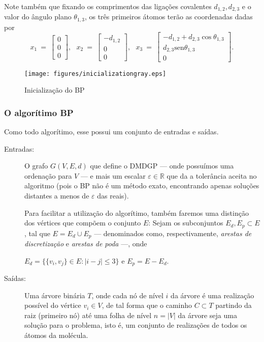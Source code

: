 Note também que fixando os comprimentos das ligações covalentes $d_{1,2},d_{2,3}$ e o valor do ângulo plano $\theta_{1,3}$, os três primeiros átomos terão as coordenadas dadas por
$$
x_1\:=\:
\begin{bmatrix}
	0\\ 
	0\\  
	0
\end{bmatrix},\:\:\:
x_2\:=\:
\begin{bmatrix}
	-d_{1,2}\\ 
	0\\  
	0
\end{bmatrix},\:\:\:
x_3\:=\:
\begin{bmatrix}
	-d_{1,2}+d_{2,3}\cos\theta_{1,3}\\ 
	d_{2,3}\mbox{sen}\theta_{1,3}\\  
	0
\end{bmatrix}.
$$

\begin{figure}[H]
	\begin{center}
		\texttt{[image: figures/inicializationgray.eps]}
	\end{center}
	\caption{Inicialização do BP}
	\label{fig:inicializacao}
\end{figure}	

\subsubsection*{O algorítimo BP}

Como todo algorítimo, esse possui um conjunto de entradas e saídas.
\begin{description}
	\item[Entradas:] O grafo $G(V, E, d)$ que define o DMDGP --- onde possuímos uma ordenação para $V$ --- e mais um escalar $\varepsilon \in \mathbb{R}$ que da a tolerância aceita no algoritmo (pois o BP não é um método exato, encontrando apenas soluções distantes a menos de $\varepsilon$ das reais).
	
	Para facilitar a utilização do algorítimo, também faremos uma distinção dos vértices que compõem o conjunto $E$: Sejam os subconjuntos $E_{d}, E_p \subset E$, tal que $E = E_{d} \cup E_{p}$ --- denominados como, respectivamente, \textit{arestas de discretização} e \textit{arestas de poda} ---, onde
	
	\begin{center}
		$E_{d} = \{\{v_i,v_j\} \in E : |i-j|\leq 3\}$ e $E_{p} = E - E_d$.
	\end{center}
	
	\item[Saídas:] Uma árvore binária $T$, onde cada nó de nível $i$ da árvore é uma realização possível do vértice $v_i \in V$, de tal forma que o caminho $C \subset T$ partindo da raiz (primeiro nó) até uma folha de nível $n = |V|$ da árvore seja uma solução para o problema, isto é, um conjunto de realizações de todos os átomos da molécula.
\end{description}

